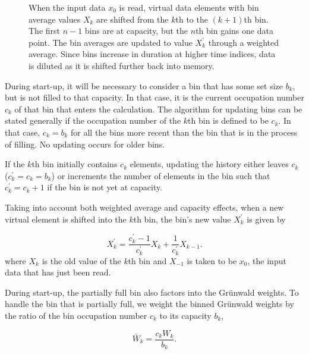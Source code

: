 \begin{figure}

\caption{When the input data $x_0$ is read, virtual data elements with bin average values $X_k$ are shifted from the $k$th to the $(k+1)$th bin. The first $n-1$ bins are at capacity, but the $n$th bin gains one data point. The bin averages are updated to value $X_k^\prime$ through a weighted average. Since bins increase in duration at higher time indices, data is diluted as it is shifted further back into memory.}
\label{fig:binShifting}
\end{figure}

During start-up, it will be necessary to consider a bin that has some
set size $b_k$, but is not filled to that capacity. In that case, it
is the current occupation number $c_k$ of that bin that enters the
calculation. The algorithm for updating bins can be stated generally if the occupation number of the $k$th bin is defined to be $c_k$. In that case, $c_k=b_k$ for all the bins more recent than the bin that is in the process of filling. No updating occurs for older bins. 

If the $k$th bin initially contains $c_k$ elements,
updating the history either leaves $c_k$ ($c_k^\prime=c_k=b_k$) or
increments the number of elements in the bin such that $c_k^\prime =
c_k + 1$ if the bin is not yet at capacity. 

Taking into account both weighted average and capacity effects, when a new virtual element is shifted into the $k$th bin, the bin's new value $X_k^\prime$ is given by 

\begin{equation}
X_k^\prime = \frac{c_k^\prime-1}{c_k^\prime}X_k + \frac{1}{c_k^\prime}X_{k-1}.
\label{eqn:updating}
\end{equation}
where $X_k$ is the old value of the $k$th bin and $X_{-1}$ is taken to be $x_0$, the input data that has just been
read. 

During start-up, the partially full bin also factors into
the Gr{\"u}nwald weights. To handle the bin that is partially full, we
weight the binned Gr{\"u}nwald weights by the ratio of the bin occupation
number $c_k$ to its capacity $b_k$,

\begin{equation}
\bar{W}_k= \frac{c_k W_k}{b_k}.
\label{eqn:Wbar}
\end{equation} 








